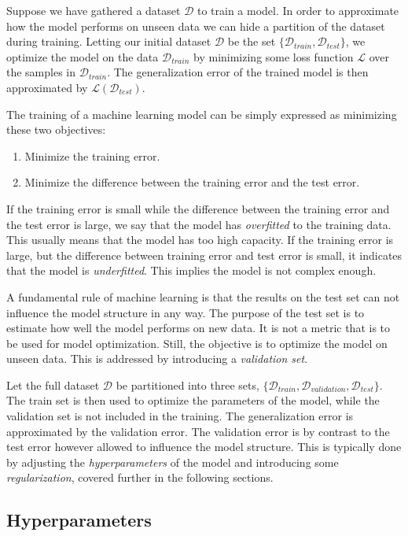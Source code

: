 Suppose we have gathered a dataset $\mathcal{D}$ to train a model. In order to approximate how the model performs on unseen data we can hide a partition of the dataset during training. Letting our initial dataset $\mathcal{D}$ be the set $\{\mathcal{D}_{train}, \mathcal{D}_{test}\}$, we optimize the model on the data $\mathcal{D}_{train}$ by minimizing some loss function $\mathcal{L}$ over the samples in $\mathcal{D}_{train}$. The generalization error of the trained model is then approximated by $\mathcal{L}(\mathcal{D}_{test})$.

The training of a machine learning model can be simply expressed as minimizing these two objectives:
\begin{enumerate}
    \item Minimize the training error.
    \item Minimize the difference between the training error and the test error. 
\end{enumerate}

If the training error is small while the difference between the training error and the test error is large, we say that the model has \emph{overfitted} to the training data. This usually means that the model has too high capacity. If the training error is large, but the difference between training error and test error is small, it indicates that the model is \emph{underfitted}. This implies the model is not complex enough.  


A fundamental rule of machine learning is that the results on the test set can not influence the model structure in any way. The purpose of the test set is to estimate how well the model performs on new data. It is not a metric that is to be used for model optimization. Still, the objective is to optimize the model on unseen data. This is addressed by introducing a \emph{validation set}. 

Let the full dataset $\mathcal{D}$ be partitioned into three sets, $\{\mathcal{D}_{train}, \mathcal{D}_{validation}, \mathcal{D}_{test} \}$. The train set is then used to optimize the parameters of the model, while the validation set is not included in the training. The generalization error is approximated by the validation error. The validation error is by contrast to the test error however allowed to influence the model structure. This is typically done by adjusting the \emph{hyperparameters} of the model and introducing some \emph{regularization}, covered further in the following sections. 

\subsection{Hyperparameters}\label{sec:hyper}

